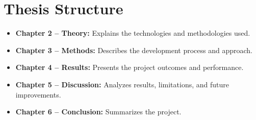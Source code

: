 \section{Thesis Structure}

\begin{itemize}
    
    \item \textbf{Chapter 2 -- Theory:} Explains the technologies and methodologies used.
    
    \item \textbf{Chapter 3 -- Methods:} Describes the development process and approach.
    
    \item \textbf{Chapter 4 -- Results:} Presents the project outcomes and performance.
    
    \item \textbf{Chapter 5 -- Discussion:} Analyzes results, limitations, and future improvements.
    
    \item \textbf{Chapter 6 -- Conclusion:} Summarizes the project.


    
\end{itemize}